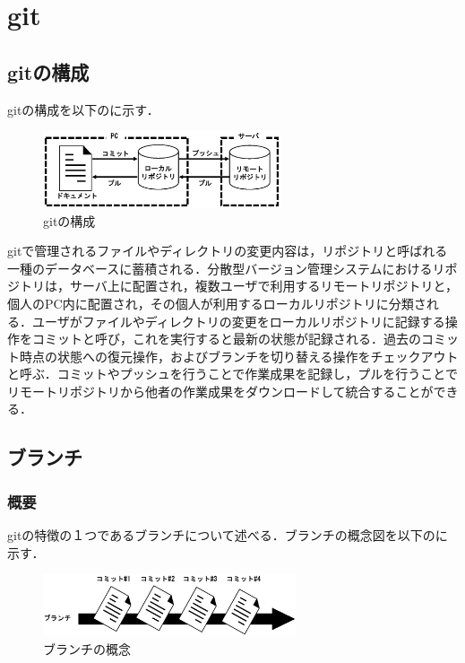 \documentclass[a4j,9pt,twocolumn]{jsarticle}
\begin{document}
\section{git}
\subsection{gitの構成}
gitの構成を以下のに示す．

\begin{figure}[h]
\centering
\includegraphics[width=70mm]{img/git.eps}
\caption{gitの構成}
\label{git}
\end{figure}

gitで管理されるファイルやディレクトリの変更内容は，リポジトリと呼ばれる一種のデータベースに蓄積される．分散型バージョン管理システムにおけるリポジトリは，サーバ上に配置され，複数ユーザで利用するリモートリポジトリと，個人のPC内に配置され，その個人が利用するローカルリポジトリに分類される．ユーザがファイルやディレクトリの変更をローカルリポジトリに記録する操作をコミットと呼び，これを実行すると最新の状態が記録される．過去のコミット時点の状態への復元操作，およびブランチを切り替える操作をチェックアウトと呼ぶ．コミットやプッシュを行うことで作業成果を記録し，プルを行うことでリモートリポジトリから他者の作業成果をダウンロードして統合することができる．

\subsection{ブランチ}
\subsubsection{概要}
gitの特徴の１つであるブランチについて述べる．ブランチの概念図を以下のに示す．

\begin{figure}[h]
\centering
\includegraphics[width=75mm]{img/branch1.eps}
\caption{ブランチの概念}
\label{branch}
\end{figure}
\end{document}
